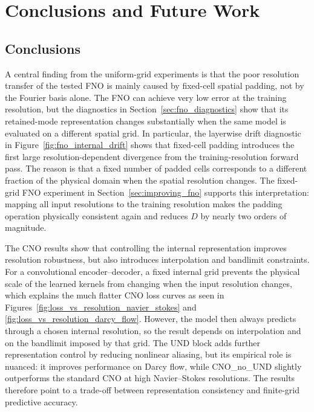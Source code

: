 \chapter{\label{cha:conclusion}Conclusions and Future Work}

\section{Conclusions}

A central finding from the uniform-grid experiments is that the poor resolution transfer of the tested FNO is mainly caused by fixed-cell spatial padding, not by the Fourier basis alone. The FNO can achieve very low error at the training resolution, but the diagnostics in Section~\ref{sec:fno_diagnostics} show that its retained-mode representation changes substantially when the same model is evaluated on a different spatial grid. In particular, the layerwise drift diagnostic in Figure~\ref{fig:fno_internal_drift} shows that fixed-cell padding introduces the first large resolution-dependent divergence from the training-resolution forward pass. The reason is that a fixed number of padded cells corresponds to a different fraction of the physical domain when the spatial resolution changes. The fixed-grid FNO experiment in Section~\ref{sec:improving_fno} supports this interpretation: mapping all input resolutions to the training resolution makes the padding operation physically consistent again and reduces \(D\) by nearly two orders of magnitude.

The CNO results show that controlling the internal representation improves resolution robustness, but also introduces interpolation and bandlimit constraints. For a convolutional encoder--decoder, a fixed internal grid prevents the physical scale of the learned kernels from changing when the input resolution changes, which explains the much flatter CNO loss curves as seen in Figures~\ref{fig:loss_vs_resolution_navier_stokes} and \ref{fig:loss_vs_resolution_darcy_flow}. However, the model then always predicts through a chosen internal resolution, so the result depends on interpolation and on the bandlimit imposed by that grid. The UND block adds further representation control by reducing nonlinear aliasing, but its empirical role is nuanced: it improves performance on Darcy flow, while CNO\_no\_UND slightly outperforms the standard CNO at high Navier--Stokes resolutions. The results therefore point to a trade-off between representation consistency and finite-grid predictive accuracy.

